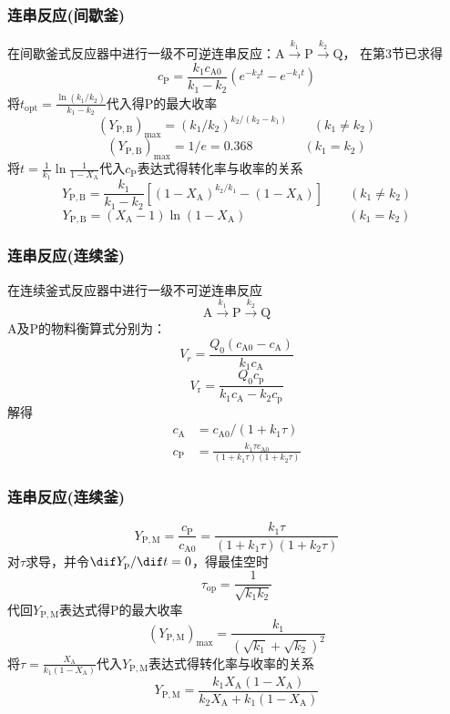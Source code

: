 \begin{frame}
    \frametitle{连串反应(间歇釜)}
    在间歇釜式反应器中进行一级不可逆连串反应：$\mathrm{A} \stackrel{k_{1}}{\longrightarrow} \mathrm{P} \stackrel{k_{2}}{\longrightarrow} \mathrm{Q}$，
    在第3节已求得
    \[
        c_{\mathrm{P}}=\frac{k_{1} c_{\mathrm{A} 0}}{k_{1}-k_{2}}\left(e^{-k_{2} t}-e^{-k_{1} t}\right)
    \]
    将$t_{\mathrm{opt}}=\frac{\ln (k_{1} / k_{2})}{k_{1}-k_{2}}$代入得P的最大收率
    \[
        (Y_{\mathrm{P}, \mathrm{B}})_{\max }=(k_1/k_2)^{k_2/{(k_2-k_1)}} \qquad (k_1 \neq k_2)
    \]
    \[
        (Y_{\mathrm{P}, \mathrm{B}})_{\max }=1/e=0.368 \qquad \qquad (k_1 = k_2)
    \]
    将$t=\frac{1}{k_1}\ln \frac{1}{1-X_\mathrm{A}}$代入$c_{\mathrm{P}}$表达式得转化率与收率的关系
    \[
        Y_{\mathrm{P}, \mathrm{B}}=\frac{k_{1}}{k_{1}-k_{2}}\left[(1-X_{\mathrm{A}})^{k_{2} / k_{1}}-(1-X_{\mathrm{A}})\right] \qquad (k_{1} \neq k_{2})
    \]
    \[
        Y_{\mathrm{P}, \mathrm{B}}=(X_\mathrm{A}-1)\ln (1-X_\mathrm{A}) \qquad \qquad \qquad \qquad  (k_{1} = k_{2})
    \]
\end{frame}


\begin{frame}
    \frametitle{连串反应(连续釜)}
    在连续釜式反应器中进行一级不可逆连串反应
    \[
        \mathrm{A} \stackrel{k_{1}}{\longrightarrow} \mathrm{P} \stackrel{k_{2}}{\longrightarrow} \mathrm{Q}
    \]
    A及P的物料衡算式分别为：
    \[
        V_{r}=\frac{Q_{0}(c_\mathrm{A0}-c_\mathrm{A})}{k_{1}c_\mathrm{A}}
    \]
    \[
        V_{\mathrm{r}}=\frac{Q_{0}c_{\mathrm{p}}}{k_{1}c_{\mathrm{A}}-k_{2}c_{\mathrm{p}}}
    \]
    解得
    \[
        \begin{aligned}
            c_{\mathrm{A}}&=c_{\mathrm{A}0}/(1+k_{1}\tau) \\
            c_\mathrm{P}&= \frac{k_1\tau c_{\mathrm{A}0}}{(1+k_1\tau)(1+k_2\tau)}
        \end{aligned}
    \]
\end{frame}


\begin{frame}
    \frametitle{连串反应(连续釜)}
    \vspace{-6pt}
    \[
        Y_\mathrm{P,M} = \frac{c_\mathrm{P}}{c_\mathrm{A0}}= \frac{k_1\tau}{(1+k_1\tau)(1+k_2\tau)}
    \]
    对$\tau$求导，并令$\dif Y_\mathrm{p}/\dif t = 0$，得最佳空时
    \[
        \tau_\mathrm{op} = \frac{1}{\sqrt{k_1k_2}}
    \]
    代回$Y_\mathrm{P,M}$表达式得P的最大收率
    \[
       (Y_{\mathrm{P}, \mathrm{M}})_{\max }=\frac{k_{1}}{(\sqrt{k_{1}}+\sqrt{k_{2}})^{2}}
    \]
    将$\tau = \frac{X_\mathrm{A}}{k_1(1-X_\mathrm{A})}$代入$Y_\mathrm{P,M}$表达式得转化率与收率的关系
    \[
        Y_{\mathrm{P}, \mathrm{M}}=\frac{k_{1} X_{\mathrm{A}}(1-X_{\mathrm{A}})}{k_{2} X_{\mathrm{A}}+k_{1}(1-X_{\mathrm{A}})}
    \]
\end{frame}


